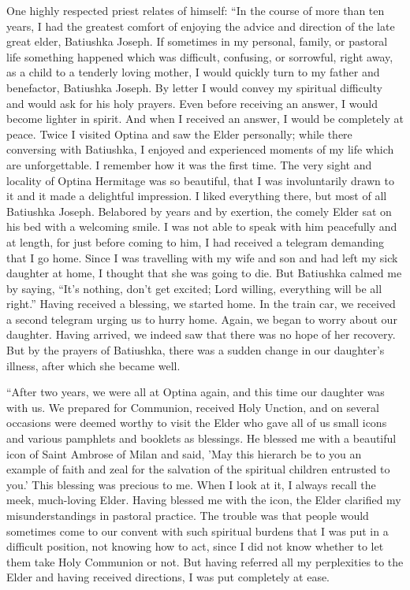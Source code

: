 One highly respected priest relates of himself: “In the course of more than ten years, I had the greatest comfort of enjoying the advice and direction of the late great elder, Batiushka Joseph. If sometimes in my personal, family, or pastoral life something happened which was difficult, confusing, or sorrowful, right away, as a child to a tenderly loving mother, I would quickly turn to my father and benefactor, Batiushka Joseph. By letter I would convey my spiritual difficulty and would ask for his holy prayers. Even before receiving an answer, I would become lighter in spirit. And when I received an answer, I would be completely at peace. Twice I visited Optina and saw the Elder personally; while there conversing with Batiushka, I enjoyed and experienced moments of my life which are unforgettable. I remember how it was the first time. The very sight and locality of Optina Hermitage was so beautiful, that I was involuntarily drawn to it and it made a delightful impression. I liked everything there, but most of all Batiushka Joseph. Belabored by years and by exertion, the comely Elder sat on his bed with a welcoming smile. I was not able to speak with him peacefully and at length, for just before coming to him, I had received a telegram demanding that I go home. Since I was travelling with my wife and son and had left my sick daughter at home, I thought that she was going to die. But Batiushka calmed me by saying, “It's nothing, don't get excited; Lord willing, everything will be all right.'' Having received a blessing, we started home. In the train car, we received a second telegram urging us to hurry home. Again, we began to worry about our daughter. Having arrived, we indeed saw that there was no hope of her recovery. But by the prayers of Batiushka, there was a sudden change in our daughter's illness, after which she became well.

“After two years, we were all at Optina again, and this time our daughter was with us. We prepared for Communion, received Holy Unction, and on several occasions were deemed worthy to visit the Elder who gave all of us small icons and various pamphlets and booklets as blessings. He blessed me with a beautiful icon of Saint Ambrose of Milan and said, 'May this hierarch be to you an example of faith and zeal for the salvation of the spiritual children entrusted to you.' This blessing was precious to me. When I look at it, I always recall the meek, much-loving Elder. Having blessed me with the icon, the Elder clarified my misunderstandings in pastoral practice. The trouble was that people would sometimes come to our convent with such spiritual burdens that I was put in a difficult position, not knowing how to act, since I did not know whether to let them take Holy Communion or not. But having referred all my perplexities to the Elder and having received directions, I was put completely at ease.

